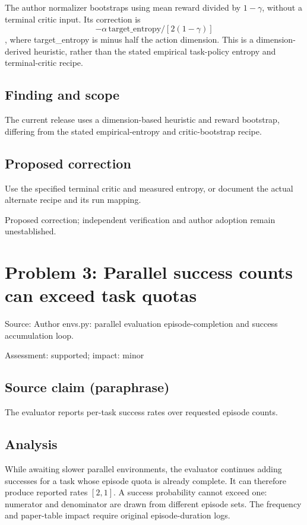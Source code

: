 \documentclass[11pt]{article}
\begin{document}
The author normalizer bootstraps using mean reward divided by \(1-\gamma\), without a terminal critic input. Its correction is \[-\alpha\,\mathrm{target\_entropy}/[2(1-\gamma)]\], where target\_entropy is minus half the action dimension. This is a dimension-derived heuristic, rather than the stated empirical task-policy entropy and terminal-critic recipe.

\subsection*{Finding and scope}

The current release uses a dimension-based heuristic and reward bootstrap, differing from the stated empirical-entropy and critic-bootstrap recipe.

\subsection*{Proposed correction}

Use the specified terminal critic and measured entropy, or document the actual alternate recipe and its run mapping.

Proposed correction; independent verification and author adoption remain unestablished.

\section*{Problem 3: Parallel success counts can exceed task quotas}

Source: Author envs.py: parallel evaluation episode-completion and success accumulation loop.

Assessment: supported; impact: minor

\subsection*{Source claim (paraphrase)}

The evaluator reports per-task success rates over requested episode counts.

\subsection*{Analysis}

While awaiting slower parallel environments, the evaluator continues adding successes for a task whose episode quota is already complete. It can therefore produce reported rates \([2,1]\). A success probability cannot exceed one: numerator and denominator are drawn from different episode sets. The frequency and paper-table impact require original episode-duration logs.
\end{document}
